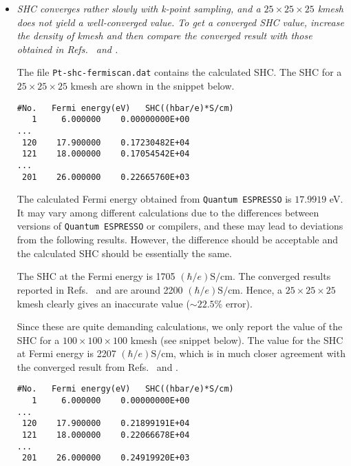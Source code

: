 \begin{itemize}
	\item {\it SHC converges rather slowly with k-point sampling, and a $25 \times 25 \times 25$ kmesh does not yield a well-converged value.
	To get a converged SHC value, increase the density of kmesh and 
	then compare the converged result with those obtained in 
	Refs.~ and .}

	The file {\tt Pt-shc-fermiscan.dat} contains the calculated SHC. 
	The SHC for a $25\times25\times25$ kmesh are shown in the snippet below. 
	 
\begin{tcolorbox}[title=$25\times25\times25$ kmesh,sharp corners,boxrule=0.5pt]
{\small
\begin{verbatim}
#No.   Fermi energy(eV)   SHC((hbar/e)*S/cm)
   1     6.000000    0.00000000E+00
...
 120    17.900000    0.17230482E+04
 121    18.000000    0.17054542E+04
...
 201    26.000000    0.22665760E+03
\end{verbatim}
}
\end{tcolorbox}

The calculated Fermi energy obtained from {\tt Quantum ESPRESSO} is $17.9919$ eV. 
It may vary among different calculations due to the differences between versions of {\tt Quantum ESPRESSO} or compilers, 
and these may lead to deviations from the following results. 
However, the difference should be acceptable and the calculated SHC should be essentially the same. 

The SHC at the Fermi energy is 1705 $(\hbar/e)\mathrm{S/cm}$. 
The converged results reported in Refs.~ 
and  are around 2200 $(\hbar/e)\mathrm{S/cm}$. 
Hence, a $25\times25\times25$ kmesh clearly gives an inaccurate value ($\sim 22.5\%$ error).

Since these are quite demanding calculations, we only report the 
value of the SHC for a $100\times100\times100$ kmesh (see snippet below). 
The value for the SHC at Fermi energy is 2207 $(\hbar/e)\mathrm{S/cm}$, which is 
in much closer agreement with the converged result from 
Refs.~ and .

\begin{tcolorbox}[title=$100\times100\times100$ kmesh,sharp corners,boxrule=0.5pt]
{\small
\begin{verbatim}
#No.   Fermi energy(eV)   SHC((hbar/e)*S/cm)
   1     6.000000    0.00000000E+00
...
 120    17.900000    0.21899191E+04
 121    18.000000    0.22066678E+04
...
 201    26.000000    0.24919920E+03
\end{verbatim}
}
\end{tcolorbox}


\end{itemize}
